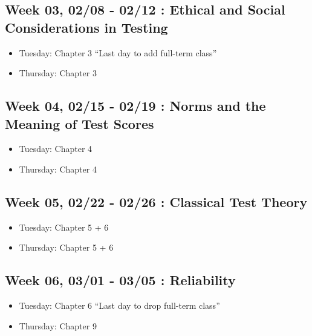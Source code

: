 \documentclass[11pt,]{article}
\providecommand{\tightlist}{%
  \setlength{\itemsep}{0pt}\setlength{\parskip}{0pt}}
\begin{document}
\hypertarget{week-03-0208---0212-ethical-and-social-considerations-in-testing}{%
\subsection{Week 03, 02/08 - 02/12 : Ethical and Social Considerations
in
Testing}\label{week-03-0208---0212-ethical-and-social-considerations-in-testing}}

\begin{itemize}
\tightlist
\item
  Tuesday: Chapter 3 ``Last day to add full-term class''
\item
  Thursday: Chapter 3
\end{itemize}

\hypertarget{week-04-0215---0219-norms-and-the-meaning-of-test-scores}{%
\subsection{Week 04, 02/15 - 02/19 : Norms and the Meaning of Test
Scores}\label{week-04-0215---0219-norms-and-the-meaning-of-test-scores}}

\begin{itemize}
\tightlist
\item
  Tuesday: Chapter 4
\item
  Thursday: Chapter 4
\end{itemize}

\hypertarget{week-05-0222---0226-classical-test-theory}{%
\subsection{Week 05, 02/22 - 02/26 : Classical Test
Theory}\label{week-05-0222---0226-classical-test-theory}}

\begin{itemize}
\tightlist
\item
  Tuesday: Chapter 5 + 6
\item
  Thursday: Chapter 5 + 6
\end{itemize}

\hypertarget{week-06-0301---0305-reliability}{%
\subsection{Week 06, 03/01 - 03/05 :
Reliability}\label{week-06-0301---0305-reliability}}

\begin{itemize}
\tightlist
\item
  Tuesday: Chapter 6 ``Last day to drop full-term class''
\item
  Thursday: Chapter 9
\end{itemize}
\end{document}
